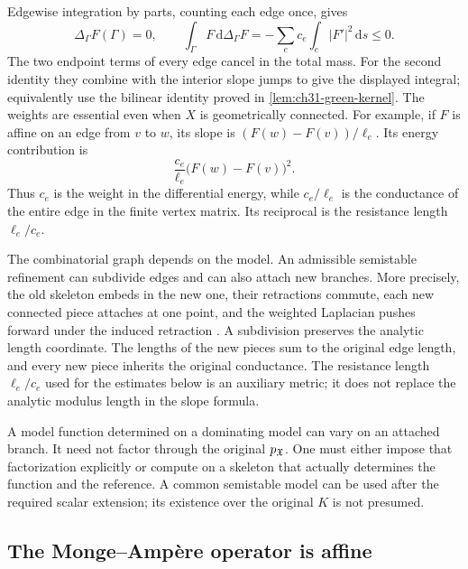 Edgewise integration by parts, counting each edge once, gives
\begin{equation}
\label{eq:graph-dirichlet-sign}
 \Delta_\Gamma F(\Gamma)=0,\qquad
 \int_\Gamma F\,\mathrm d\Delta_\Gamma F
       =-\sum_e c_e\int_e|F'|^2\,\mathrm ds\leq0.
\end{equation}
The two endpoint terms of every edge cancel in the total mass.
For the second identity they combine with the interior slope jumps
to give the displayed integral; equivalently use the bilinear
identity proved in \cref{lem:ch31-green-kernel}.
The weights are essential even when \(X\) is geometrically connected.
For example, if \(F\) is affine on an edge from \(v\) to \(w\), its
slope is \((F(w)-F(v))/\ell_e\).  Its energy contribution is
\[
             \frac{c_e}{\ell_e}\bigl(F(w)-F(v)\bigr)^2.
\]
Thus \(c_e\) is the weight in the differential energy, while
\(c_e/\ell_e\) is the conductance of the entire edge in the finite
vertex matrix.  Its reciprocal is the resistance length
\(\ell_e/c_e\).

\begin{remark}
\label{rem:ch31-lengths}
The combinatorial graph depends on the model.  An admissible
semistable refinement can subdivide edges and can also attach new
branches.  More precisely, the old skeleton embeds in the new one,
their retractions commute, each new connected piece attaches at one
point, and the weighted Laplacian pushes forward under the induced
retraction \cite[Proposition~2.2.26]{Thu05}.
A subdivision preserves the analytic length coordinate.  The lengths
of the new pieces sum to the original edge length, and every new
piece inherits the original conductance.  The resistance length
\(\ell_e/c_e\) used for the estimates below is an auxiliary metric;
it does not replace the analytic modulus length in the slope formula.

A model function determined on a dominating model can vary on an
attached branch.  It need not factor through the original \(p_{\mathfrak X}\).
One must either impose that factorization explicitly or compute on
a skeleton that actually determines the function and the reference.
A common semistable model can be used after the required scalar
extension; its existence over the original \(K\) is not presumed.
\end{remark}

\subsection{The Monge--Amp\`ere operator is affine}
\label{sec:ch31-curve-affine}

